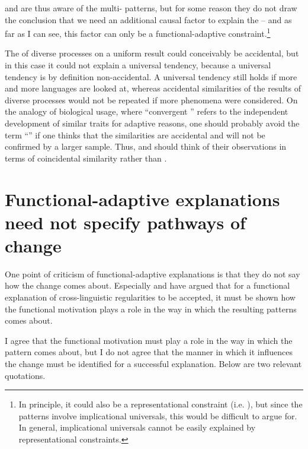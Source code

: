 \documentclass[output=paper]{langsci/langscibook}
\begin{document}
\noindent {} and  are thus aware of the multi- patterns, but for some reason they do not draw the conclusion that we need an additional causal factor to explain the  – and as far as I can see, this factor can only be a functional-adaptive constraint.\footnote{In principle, it could also be a representational constraint (i.e. ), but since the patterns involve implicational universals, this would be difficult to argue for. In general, implicational universals cannot be easily explained by representational constraints.}

The  of diverse processes on a uniform result could conceivably be accidental, but in this case it could not explain a universal tendency, because a universal tendency is by definition non-accidental. A universal tendency still holds if more and more languages are looked at, whereas accidental similarities of the results of diverse processes would not be repeated if more phenomena were considered. On the analogy of biological usage, where “convergent ” refers to the independent development of similar traits for adaptive reasons, one should probably avoid the term “” if one thinks that the similarities are accidental and will not be confirmed by a larger sample. Thus,  and  should think of their observations in terms of coincidental similarity rather than .

\section{Functional-adaptive explanations need not specify pathways of change}\label{sec:haspelmath:6}

One point of criticism of functional-adaptive explanations is that they do not say how the change comes about. Especially  and  have argued that for a functional explanation of cross-linguistic regularities to be accepted, it must be shown how the functional motivation plays a role in the way in which the resulting patterns comes about.

I agree that the functional motivation must play a role in the way in which the pattern comes about, but I do not agree that the manner in which it influences the change must be identified for a successful explanation. Below are two relevant quotations.
\end{document}
